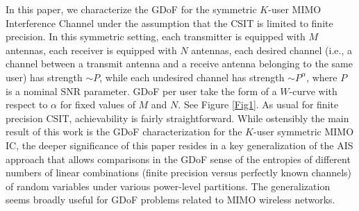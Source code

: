 \documentclass[11pt]{article}
\begin{document}

In this paper, we characterize the GDoF for the symmetric  $K$-user MIMO Interference Channel  under the assumption that the CSIT is limited to finite precision. In this symmetric setting, each transmitter is equipped with $M$ antennas, each receiver is equipped with $N$ antennas, each desired channel (i.e., a channel between a transmit antenna and a receive antenna belonging to the same user) has strength $\sim P$, while each undesired channel has strength $\sim P^\alpha$, where $P$ is a nominal SNR parameter.  GDoF per user take the form of a $W$-curve with respect to $\alpha$ for fixed values of $M$ and $N$. See Figure \ref{Fig1}. As usual for finite precision CSIT, achievability is fairly straightforward. While ostensibly the main result of this work is the GDoF characterization for the $K$-user symmetric MIMO IC, the deeper significance of this paper resides in a key generalization of the AIS approach that allows comparisons in the GDoF sense of the entropies of  different numbers of linear combinations (finite precision versus perfectly known channels) of random variables under various power-level partitions. The generalization seems broadly useful for GDoF problems related to MIMO wireless networks. 
\end{document}
